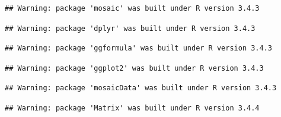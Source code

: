 \documentclass[]{article}
\newenvironment{Shaded}{\begin{snugshade}}{\end{snugshade}}
\newcommand{\KeywordTok}[1]{\textcolor[rgb]{0.13,0.29,0.53}{\textbf{#1}}}
\newcommand{\DataTypeTok}[1]{\textcolor[rgb]{0.13,0.29,0.53}{#1}}
\newcommand{\DecValTok}[1]{\textcolor[rgb]{0.00,0.00,0.81}{#1}}
\newcommand{\StringTok}[1]{\textcolor[rgb]{0.31,0.60,0.02}{#1}}
\newcommand{\CommentTok}[1]{\textcolor[rgb]{0.56,0.35,0.01}{\textit{#1}}}
\newcommand{\OtherTok}[1]{\textcolor[rgb]{0.56,0.35,0.01}{#1}}
\newcommand{\OperatorTok}[1]{\textcolor[rgb]{0.81,0.36,0.00}{\textbf{#1}}}
\newcommand{\NormalTok}[1]{#1}
\begin{document}
\begin{Shaded}
\end{Shaded}

\begin{verbatim}
## Warning: package 'mosaic' was built under R version 3.4.3
\end{verbatim}

\begin{verbatim}
## Warning: package 'dplyr' was built under R version 3.4.3
\end{verbatim}

\begin{verbatim}
## Warning: package 'ggformula' was built under R version 3.4.3
\end{verbatim}

\begin{verbatim}
## Warning: package 'ggplot2' was built under R version 3.4.3
\end{verbatim}

\begin{verbatim}
## Warning: package 'mosaicData' was built under R version 3.4.3
\end{verbatim}

\begin{verbatim}
## Warning: package 'Matrix' was built under R version 3.4.4
\end{verbatim}
\end{document}
